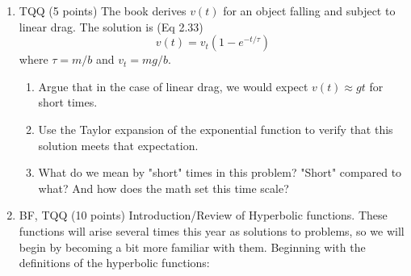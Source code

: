 \documentclass[12pt]{article}
\begin{document}
\begin{enumerate}
\item TQQ (5 points)  The book derives $v(t)$ for an object falling and subject to linear drag.  The solution is (Eq 2.33)
$$v(t)=v_t \left(1-e^{-t/\tau} \right)$$
  where $\tau = m/b$ and $v_t = mg/b$.

  \begin{enumerate}\item
	Argue that in the case of linear drag, we would expect $v(t) \approx gt$ for short times.
  \item
	Use the Taylor expansion of the exponential function to verify that this solution meets that expectation.
	\item What do we mean by "short" times in this problem?  "Short" compared to what?  And how does the math set this time scale?
  \end{enumerate}


  \item 	BF, TQQ (10 points)  Introduction/Review of Hyperbolic functions.  These functions will arise several times this year as solutions to problems, so we will begin by becoming a bit more familiar with them. Beginning with the definitions of the hyperbolic functions:


\end{enumerate}
\end{document}
